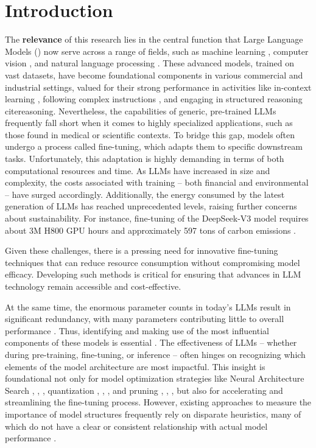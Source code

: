 
\section*{Introduction}

    The \textbf{relevance} of this research lies in the central function that Large Language Models (\llms{}) now serve across a range of fields, such as machine learning \cite{machine_learning}, computer vision \cite{computer_vision}, and natural language processing \cite{brown2020languagemodelsfewshotlearners}. These advanced models, trained on vast datasets, have become foundational components in various commercial and industrial settings, valued for their strong performance in activities like in-context learning \cite{brown2020languagemodelsfewshotlearners}, following complex instructions \cite{instruction_following}, and engaging in structured reasoning cite{reasoning}. Nevertheless, the capabilities of generic, pre-trained LLMs frequently fall short when it comes to highly specialized applications, such as those found in medical or scientific contexts. To bridge this gap, models often undergo a process called fine-tuning, which adapts them to specific downstream tasks. Unfortunately, this adaptation is highly demanding in terms of both computational resources and time. As LLMs have increased in size and complexity, the costs associated with training -- both financial and environmental -- have surged accordingly. Additionally, the energy consumed by the latest generation of LLMs has reached unprecedented levels, raising further concerns about sustainability. For instance, fine-tuning of the DeepSeek-V3 model requires about 3M H800 GPU hours \cite{deepseekai2025deepseekv3technicalreport} and approximately 597 tons of carbon emissions  \cite{aiindex2026}.

    Given these challenges, there is a pressing need for innovative fine-tuning techniques that can reduce resource consumption without compromising model efficacy. Developing such methods is critical for ensuring that advances in LLM technology remain accessible and cost-effective.
    
    At the same time, the enormous parameter counts in today’s LLMs result in significant redundancy, with many parameters contributing little to overall performance \cite{overparametrization}. Thus, identifying and making use of the most influential components of these models is essential \cite{yu2024superweightlargelanguage}. The effectiveness of LLMs -- whether during pre-training, fine-tuning, or inference -- often hinges on recognizing which elements of the model architecture are most impactful. This insight is foundational not only for model optimization strategies like Neural Architecture Search \cite{LPZero}, \cite{synflow}, \cite{snip}, quantization \cite{quantization_1}, \cite{int8}, \cite{SqueezeLLM}, and pruning \cite{uidl}, \cite{sleb}, \cite{wanda}, but also for accelerating and streamlining the fine-tuning process. However, existing approaches to measure the importance of model structures frequently rely on disparate heuristics, many of which do not have a clear or consistent relationship with actual model performance \cite{LPZero}.

